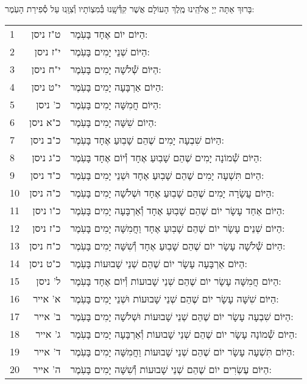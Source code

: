 \documentclass[twoside, openany, parskip=half, 11pt]{book}
\begin{document}
בָּרוּךְ אַתָּה יְיָ אֱלֹהֵֽינוּ מֶֽלֶךְ הָעוֹלָם אֲשֶׁר קִדְּ֯שָֽׁנוּ בְּ֯מִצְוֹתָיו וְ֯צִוָּֽנוּ עַל סְ֯פִירַת הָעֹֽמֶר:\\

\begin{scriptsize}
\begin{longtable}{ l | r | p{} }
1 & ט"ז ניסן & הַיּוֹם יוֹם אֶחָד בָּעֹֽמֶר: \\
2 & י"ז ניסן & הַיּוֹם שְׁנֵי יָמִים בָּעֹֽמֶר: \\
3 & י"ח ניסן & הַיּוֹם שְׁ֯לֹשָׁה יָמִים בָּעֹֽמֶר: \\
4 & י"ט ניסן & הַיּוֹם אַרְבָּעָה יָמִים בָּעֹֽמֶר: \\
5 & כ' ניסן & הַיּוֹם חֲמִשָּׁה יָמִים בָּעֹֽמֶר: \\
6 & כ"א ניסן & הַיוֹם שִׁשָּׁה יָמִים בָּעֹֽמֶר: \\
7 & כ"ב ניסן & הַיּוֹם שִׁבְעָה יָמִים שֶׁהֵם שָׁבֽוּעַ אֶחָד בָּעֹֽמֶר: \\
8 & כ"ג ניסן & הַיּוֹם שְׁ֯מוֹנָה יָמִים שֶׁהֵם שָׁבֽוּעַ אֶחָד וְ֯יוֹם אֶחָד בָּעֹֽמֶר: \\
9 & כ"ד ניסן & הַיּוֹם תִּשְׁעָה יָמִים שֶׁהֵם שָׁבֽוּעַ אֶחָד וּשְׁנֵי יָמִים בָּעֹֽמֶר: \\
10 & כ"ה ניסן & הַיּוֹם עֲשָׂרָה יָמִים שֶׁהֵם שָׁבֽוּעַ אֶחָד וּשְׁלֹשָׁה יָמִים בָּעֹֽמֶר: \\
11 & כ"ו ניסן & הַיּוֹם אַחַד עָשָׂר יוֹם שֶׁהֵם שָׁבֽוּעַ אֶחָד וְ֯אַרְבָּעָה יָמִים בָּעֹֽמֶר: \\
12 & כ"ז ניסן & הַיּוֹם שְׁנֵים עָשָׂר יוֹם שֶׁהֵם שָׁבֽוּעַ אֶחָד וַחֲמִשָּׁה יָמִים בָּעֹֽמֶר: \\
13 & כ"ח ניסן & הַיּוֹם שְׁ֯לֹשָׁה עָשָׂר יוֹם שֶׁהֵם שָׁבֽוּעַ אֶחָד וְ֯שִׁשָּׁה יָמִים בָּעֹֽמֶר: \\
14 & כ"ט ניסן & הַיּוֹם אַרְבָּעָה עָשָׂר יוֹם שֶׁהֵם שְׁנֵי שָׁבוּעוֹת בָּעֹֽמֶר: \\
15 & ל' ניסן & הַיּוֹם חֲמִשָּׁה עָשָׂר יוֹם שֶׁהֵם שְׁנֵי שָׁבוּעוֹת וְ֯יוֹם אֶחָד בָּעֹֽמֶר: \\
16 & א' אייר & הַיּוֹם שִׁשָּׁה עָשָׂר יוֹם שֶׁהֵם שְׁנֵי שָׁבוּעוֹת וּשְׁנֵי יָמִים בָּעֹֽמֶר: \\
17 & ב' אייר & הַיּוֹם שִׁבְעָה עָשָׂר יוֹם שֶׁהֵם שְׁנֵי שָׁבוּעוֹת וּשְׁלֹשָׁה יָמִים בָּעֹֽמֶר: \\
18 & ג' אייר & הַיּוֹם שְׁ֯מוֹנָה עָשָׂר יוֹם שֶׁהֵם שְׁנֵי שָׁבוּעוֹת וְ֯אַרְבָּעָה יָמִים בָּעֹֽמֶר: \\
19 & ד' אייר & הַיּוֹם תִּשְׁעָה עָשָׂר יוֹם שֶׁהֵם שְׁנֵי שָׁבוּעוֹת וַחֲמִשָּׁה יָמִים בָּעֹֽמֶר: \\
20 & ה' אייר & הַיּוֹם עֶשְׂרִים יוֹם שֶׁהֵם שְׁנֵי שָׁבוּעוֹת וְ֯שִׁשָּׁה יָמִים בָּעֹֽמֶר: \\

\end{longtable}
\end{scriptsize}
\end{document}
